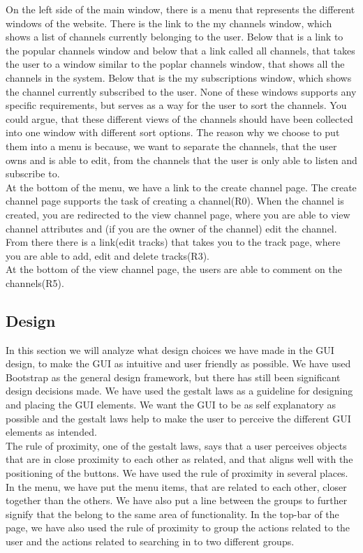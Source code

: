 \documentclass[a4paper,11pt,report]{article}
\begin{document}
On the left side of the main window, there is a menu that represents the different windows of the website. There is the link to the my channels window, which shows a list of channels currently belonging to the user. Below that is a link to the popular channels window and below that a link called all channels, that takes the user to a window similar to the poplar channels window, that shows all the channels in the system. Below that is the my subscriptions window, which shows the channel currently subscribed to the user. None of these windows supports any specific requirements, but serves as a way for the user to sort the channels. You could argue, that these different views of the channels should have been collected into one window with different sort options. The reason why we choose to put them into a menu is because, we want to separate the channels, that the user owns and is able to edit, from the channels that the user is only able to listen and subscribe to.\\

At the bottom of the menu, we have a link to the create channel page. The create channel page supports the task of creating a channel(R0). When the channel is created, you are redirected to the view channel page, where you are able to view channel attributes and (if you are the owner of the channel) edit the channel. From there there is a link(edit tracks) that takes you to the track page, where you are able to add, edit and delete tracks(R3).\\

At the bottom of the view channel page, the users are able to comment on the channels(R5). \\

\subsection{Design}
In this section we will analyze what design choices we have made in the GUI design, to make the GUI as intuitive and user friendly as possible. We have used Bootstrap as the general design framework, but there has still been significant design decisions made. We have used the gestalt laws\cite{gestalt} as a guideline for designing and placing the GUI elements. We want the GUI to be as self explanatory as possible and the gestalt laws help to make the user to perceive the different GUI elements as intended. \\

The rule of proximity, one of the gestalt laws, says that a user perceives objects that are in close proximity to each other as related, and that aligns well with the positioning of the buttons. We have used the rule of proximity in several places. In the menu, we have put the menu items, that are related to each other, closer together than the others. We have also put a line between the groups to further signify that the belong to the same area of functionality. In the top-bar of the page, we have also used the rule of proximity to group the actions related to the user and the actions related to searching in to two different groups. \\
\end{document}
